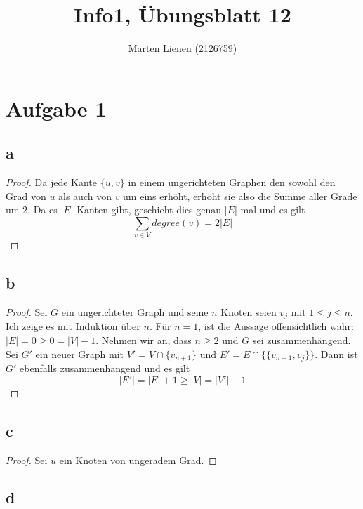 \documentclass[a4paper,10pt]{article}
\title{Info1, Übungsblatt 12}
\author{Marten Lienen (2126759)}
\begin{document}
\maketitle

\section*{Aufgabe 1}

\subsection*{a}

\begin{proof}
 Da jede Kante $\{u, v\}$ in einem ungerichteten Graphen den sowohl den Grad von $u$ als auch von $v$ um eins erhöht, erhöht sie also die Summe aller Grade um $2$.
 Da es $|E|$ Kanten gibt, geschieht dies genau $|E|$ mal und es gilt
 \begin{equation}
  \sum_{v \in V} degree(v) = 2|E|
 \end{equation}
\end{proof}

\subsection*{b}

\begin{proof}
 Sei $G$ ein ungerichteter Graph und seine $n$ Knoten seien $v_j$ mit $1 \le j \le n$.
 Ich zeige es mit Induktion über $n$.
 Für $n = 1$, ist die Aussage offensichtlich wahr: $|E| = 0 \ge 0 = |V| - 1$.
 Nehmen wir an, dass $n \ge 2$ und $G$ sei zusammenhängend.
 Sei $G'$ ein neuer Graph mit $V' = V \cap \{ v_{n + 1} \}$ und $E' = E \cap \{ \{v_{n + 1}, v_j\} \}$.
 Dann ist $G'$ ebenfalls zusammenhängend und es gilt
 \begin{equation}
  |E'| = |E| + 1 \ge |V| = |V'| - 1
 \end{equation}
\end{proof}

\subsection*{c}

\begin{proof}
 Sei $u$ ein Knoten von ungeradem Grad.
 
\end{proof}

\subsection*{d}
\end{document}
